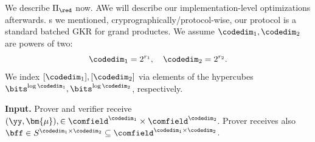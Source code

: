 We  describe $\Pi_{\red}$ now. AWe will describe our implementation-level optimizations afterwards. s we mentioned, cryprographically/protocol-wise, our protocol is a standard batched GKR for grand productes.  We assume $\codedim_1,\codedim_2$ are powers of two:
%
$$
\codedim_1 = 2^{r_1}, \quad \codedim_2 = 2^{r_2}.
$$
We index $[\codedim_1],[\codedim_2]$ via elements of the hypercubes $\bits^{\log \codedim_1}, \bits^{\log \codedim_2}$, respectively.
%
\renewcommand{\cc}{\mathbf{c}}
\begin{construction}\label{c:gkr_grand_product}
\noindent \textbf{Input.}   Prover and verifier receive $(\yy,\bm{\mu}),  \in \comfield^{\codedim_1} \times  \comfield^{\codedim_2}$. Prover receives also $\bff\in S^{\codedim_1\times \codedim_2}\subseteq\comfield^{\codedim_1\times \codedim_2}$.



\end{construction}
